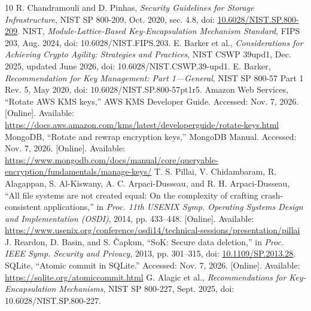 \documentclass[10pt,conference]{IEEEtran}
\begin{document}
\begin{thebibliography}{10}
 R. Chandramouli and D. Pinhas, \emph{Security Guidelines for Storage Infrastructure}, NIST SP 800-209, Oct. 2020, sec. 4.8, doi: \href{https://doi.org/10.6028/NIST.SP.800-209}{10.6028/NIST.SP.800-209}.
 NIST, \emph{Module-Lattice-Based Key-Encapsulation Mechanism Standard}, FIPS 203, Aug. 2024, doi: 10.6028/NIST.FIPS.203.
 E. Barker et al., \emph{Considerations for Achieving Crypto Agility: Strategies and Practices}, NIST CSWP 39upd1, Dec. 2025, updated June 2026, doi: 10.6028/NIST.CSWP.39-upd1.
 E. Barker, \emph{Recommendation for Key Management: Part 1---General}, NIST SP 800-57 Part 1 Rev. 5, May 2020, doi: 10.6028/NIST.SP.800-57pt1r5.
 Amazon Web Services, ``Rotate AWS KMS keys,'' AWS KMS Developer Guide. Accessed: Nov. 7, 2026. [Online]. Available: \url{https://docs.aws.amazon.com/kms/latest/developerguide/rotate-keys.html}
 MongoDB, ``Rotate and rewrap encryption keys,'' MongoDB Manual. Accessed: Nov. 7, 2026. [Online]. Available: \url{https://www.mongodb.com/docs/manual/core/queryable-encryption/fundamentals/manage-keys/}
 T. S. Pillai, V. Chidambaram, R. Alagappan, S. Al-Kiswany, A. C. Arpaci-Dusseau, and R. H. Arpaci-Dusseau, ``All file systems are not created equal: On the complexity of crafting crash-consistent applications,'' in \emph{Proc. 11th USENIX Symp. Operating Systems Design and Implementation (OSDI)}, 2014, pp. 433--448. [Online]. Available: \url{https://www.usenix.org/conference/osdi14/technical-sessions/presentation/pillai}
 J. Reardon, D. Basin, and S. \v{C}apkun, ``SoK: Secure data deletion,'' in \emph{Proc. IEEE Symp. Security and Privacy}, 2013, pp. 301--315, doi: \href{https://doi.org/10.1109/SP.2013.28}{10.1109/SP.2013.28}.
 SQLite, ``Atomic commit in SQLite.'' Accessed: Nov. 7, 2026. [Online]. Available: \url{https://sqlite.org/atomiccommit.html}
 G. Alagic et al., \emph{Recommendations for Key-Encapsulation Mechanisms}, NIST SP 800-227, Sept. 2025, doi: 10.6028/NIST.SP.800-227.
\end{thebibliography}
\end{document}
